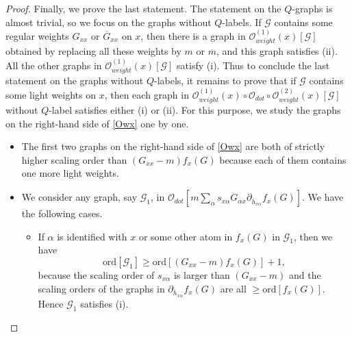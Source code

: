 \documentclass{article}
\newcommand{\1}{\mathds{1}}
\numberwithin{equation}{section}
\newcommand{\al}{\alpha}
\newcommand{\be}{\begin{equation}}
\newcommand{\ee}{\end{equation}}
\renewcommand{\cal}{\mathcal}
\renewcommand{\geq}{\geqslant}
\renewcommand{\ge}{\geq}
\theoremstyle{plain} %
\theoremstyle{remark}
\begin{document}
\begin{proof}
Finally, we prove the last statement. The statement on the $Q$-graphs is almost trivial, so we focus on the graphs without $Q$-labels. 
If $\cal G$ contains some regular weights $G_{xx}$ or $\overline G_{xx}$ on $x$, then there is a graph in ${\cal O}^{(1)}_{weight}(x)  [\cal G]$ obtained by replacing all these weights by $m$ or $\overline m$, and this graph satisfies (ii). All the other graphs in ${\cal O}^{(1)}_{weight}(x)  [\cal G]$ satisfy (i).
Thus to conclude the last statement on the graphs without $Q$-labels, it remains to prove that if $\cal G$ contains some light weights on $x$, then each graph in ${\cal O}^{(1)}_{weight}(x) \circ\cal O_{dot} \circ  {\cal O}^{(2)}_{weight}(x) [\cal G]$ without $Q$-label satisfies either (i) or (ii).  For this purpose, we study the graphs on the right-hand side of \eqref{Owx} one by one. 

\begin{itemize}
\item[(1)] %
The first two graphs on the right-hand side of \eqref{Owx} are both of strictly higher scaling order than $(G_{xx}  -  m)f_x(G)$ because each of them contains one more light weights. 

\item[(2)] We consider any graph, say $\cal G_1$, in $\cal O_{dot}\left[m  \sum_\al s_{x \al} G_{\al x}\partial_{\overline h_{x\al}} f_x(G)\right]$. We have the following cases.
\begin{itemize}
\item  If $\al$ is identified with $x$ or some other atom in $f_x(G)$ in $\cal G_1$, then we have
\be\label{larger weight}\text{ord} \left[ \cal G_1 \right] \ge \text{ord} \left[(G_{xx}  -  m)f_x(G)\right] + 1 ,\ee
because the scaling order of $s_{x\al}$ is larger than $(G_{xx}-m)$ and the scaling orders of the graphs in $ \partial_{\overline h_{x\al}}f_x(G) $ are all $ \ge \text{ord}[f_x(G) ] $. Hence $\cal G_1$ satisfies (i).



\end{itemize}
\end{itemize}
\end{proof}
\end{document}
